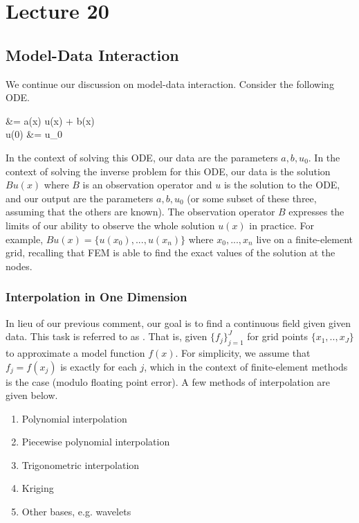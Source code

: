 \chapter{Lecture 20}
\section{Model-Data Interaction}
We continue our discussion on model-data interaction. Consider the following ODE.
\begin{ceqn} \label{eqn:20:ode}
 &= a(x) u(x) +  b(x) \\
u(0) &= u_0
\end{ceqn}
In the context of solving this ODE, our data are the parameters $a,b,u_0$. In the context of solving the inverse problem for this ODE, our data is the solution $Bu(x)$ where $B$ is an observation operator and $u$ is the solution to the ODE, and our output are the parameters $a,b,u_0$ (or some subset of these three, assuming that the others are known). The observation operator $B$ expresses the limits of our ability to observe the whole solution $u(x)$ in practice. For example, $Bu(x) = \{u(x_0),...,u(x_n)\}$ where $x_0,...,x_n$ live on a finite-element grid, recalling that FEM is able to find the exact values of the solution at the nodes.

\subsection{Interpolation in One Dimension}
In lieu of our previous comment, our goal is to find a continuous field given given data. This task is referred to as . That is, given $\{f_j\}_{j=1}^{J}$ for grid points $\{x_1,..,x_J\}$ to approximate a model function $f(x)$. For simplicity, we assume that $f_j=f(x_j)$ is exactly for each $j$, which in the context of finite-element methods is the case (modulo floating point error). A few methods of interpolation are given below.

\begin{center}
\begin{enumerate}
    \item Polynomial interpolation \label{eqn:20:polyint}
    \item Piecewise polynomial interpolation \label{eqn:20:pcwpoly}
    \item Trigonometric interpolation \label{eqn:20:trigint}
    \item Kriging \label{eqn:20:krig}
    \item Other bases, e.g. wavelets \label{eqn:20:other}
\end{enumerate}
\end{center}

